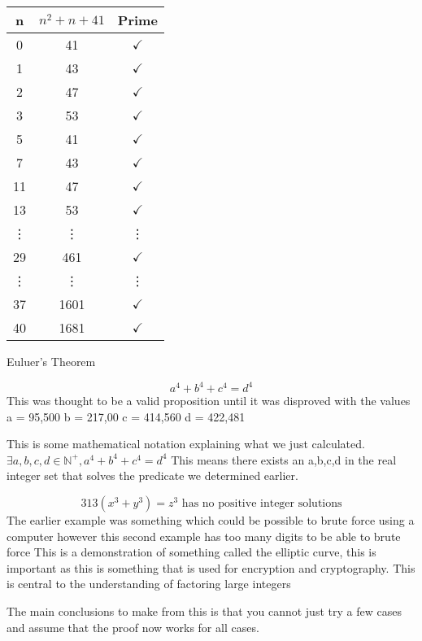 \documentclass[12pt,a4paper]{article}
\begin{document}
\vspace{0.5cm}

\begin{tabular}{c|c|c}
n & $n^2+n+41$ & Prime \\
\hline
0 & 41 & \( \checkmark \) \\
1 & 43 & \( \checkmark \)\\ 
2 & 47 & \( \checkmark \) \\
3 & 53 & \( \checkmark \)\\
5 & 41 & $\checkmark$ \\
7 & 43 & $\checkmark$ \\
11 & 47 & $\checkmark$ \\
13 & 53 & $\checkmark$ \\
\vdots & \vdots & \vdots \\
29 & 461 & $\checkmark$ \\
\vdots & \vdots & \vdots \\
37 & 1601 & $\checkmark$ \\
40 & 1681 & \( \checkmark \) \\ 
  
\end{tabular}

\medskip
Euluer's Theorem 

\begin{equation}
a^4+b^4+c^4 = d^4
\end{equation}
This was thought to be a valid proposition until it was disproved with the values 
a = 95,500
b = 217,00
c = 414,560
d = 422,481

This is some mathematical notation explaining what we just calculated.
\( \exists a,b,c,d \in \mathbb{N}^+, a^4+b^4+c^4=d^4\)
This means there exists an a,b,c,d in the real integer set that solves the predicate we determined earlier.

\begin{equation}
  313 (x^3+y^3) = z^3 \text{ has no positive integer solutions}
\end{equation}
The earlier example was something which could be possible to brute force using a computer however this second example has too many digits to be able to brute force 
This is a demonstration of something called the elliptic curve, this is important as this is something that is used for encryption and cryptography. This is central to the understanding of factoring large integers 

The main conclusions to make from this is that you cannot just try a few cases and assume that the proof now works for all cases.
\end{document}
